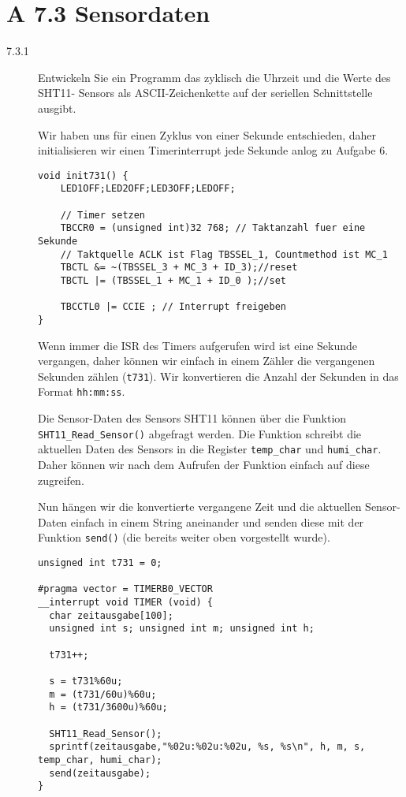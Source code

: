 \documentclass[11pt,a4paper,ngerman]{article}
\begin{document}
\section*{A 7.3 Sensordaten}
\begin{description}
\item[7.3.1] Entwickeln Sie ein Programm das zyklisch die Uhrzeit und die Werte des SHT11- Sensors als ASCII-Zeichenkette auf der seriellen Schnittstelle ausgibt.

Wir haben uns für einen Zyklus von einer Sekunde entschieden, daher initialisieren wir einen Timerinterrupt jede Sekunde anlog zu
Aufgabe 6.
\begin{lstlisting}
void init731() {
    LED1OFF;LED2OFF;LED3OFF;LEDOFF;
    
    // Timer setzen
    TBCCR0 = (unsigned int)32 768; // Taktanzahl fuer eine Sekunde
    // Taktquelle ACLK ist Flag TBSSEL_1, Countmethod ist MC_1
    TBCTL &= ~(TBSSEL_3 + MC_3 + ID_3);//reset 
    TBCTL |= (TBSSEL_1 + MC_1 + ID_0 );//set
    
    TBCCTL0 |= CCIE ; // Interrupt freigeben
}
\end{lstlisting}

Wenn immer die ISR des Timers aufgerufen wird ist eine Sekunde vergangen, daher können wir einfach in einem Zähler
die vergangenen Sekunden zählen (\lstinline|t731|). Wir konvertieren die Anzahl der Sekunden in das Format
\lstinline|hh:mm:ss|. 

Die Sensor-Daten des Sensors SHT11 können über die Funktion \lstinline|SHT11_Read_Sensor()| abgefragt werden. Die Funktion schreibt
die aktuellen Daten des Sensors in die Register \lstinline|temp_char| und \lstinline|humi_char|. Daher können wir nach dem Aufrufen der Funktion
einfach auf diese zugreifen.

Nun hängen wir die konvertierte vergangene Zeit und die aktuellen Sensor-Daten einfach in einem String aneinander und senden diese mit der Funktion \lstinline|send()| (die bereits weiter oben vorgestellt wurde).

\begin{lstlisting}
unsigned int t731 = 0;

#pragma vector = TIMERB0_VECTOR
__interrupt void TIMER (void) {
  char zeitausgabe[100];
  unsigned int s; unsigned int m; unsigned int h;
  
  t731++;
  
  s = t731%60u;
  m = (t731/60u)%60u;
  h = (t731/3600u)%60u;
  
  SHT11_Read_Sensor();
  sprintf(zeitausgabe,"%02u:%02u:%02u, %s, %s\n", h, m, s, temp_char, humi_char);
  send(zeitausgabe);
}
\end{lstlisting}

\end{description}

\label{LastPage}
\end{document}
